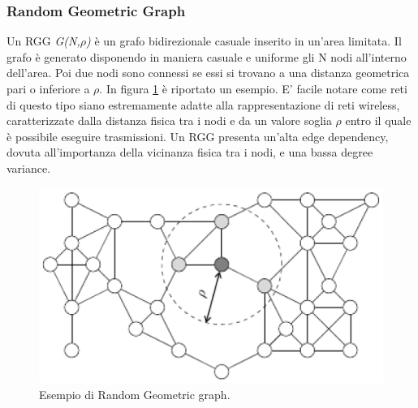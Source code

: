 \subsubsection{Random Geometric Graph}
\label{subsubsec:rgg}
Un \acf{RGG} \textit{G(N,$ \rho $)} è un grafo bidirezionale casuale inserito in un'area limitata. Il grafo è generato disponendo in maniera casuale e uniforme gli N nodi all'interno dell'area. Poi due nodi sono connessi se essi si trovano a una distanza geometrica pari o inferiore a \textit{$ \rho $}. In figura \ref{fig:RandomGeometricGraph} è riportato un esempio. E' facile notare come reti di questo tipo siano estremamente adatte alla rappresentazione di reti wireless, caratterizzate dalla distanza fisica tra i nodi e da un valore soglia \textit{$ \rho $} entro il quale è possibile eseguire trasmissioni. Un \acs{RGG} presenta un'alta edge dependency, dovuta all'importanza della vicinanza fisica tra i nodi, e una bassa degree variance.
\bigskip
\begin{figure}[h]
	\centering
	\includegraphics[width=0.7\linewidth,keepaspectratio]{Images/reti/RandomGeometricGraph}
	\caption[Random Geometric grah]{Esempio di Random Geometric graph\cite{comparisonGAonRT2014-ita}.}
	\label{fig:RandomGeometricGraph}
\end{figure}
\bigskip

